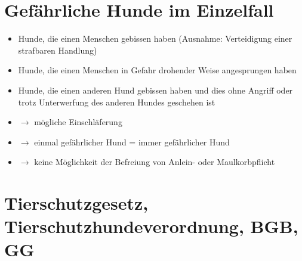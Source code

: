 \section{Gefährliche Hunde im Einzelfall}
    \begin{itemize}
        \item Hunde, die einen Menschen gebissen haben (Ausnahme: Verteidigung einer strafbaren Handlung)
        \item Hunde, die einen Menschen in Gefahr drohender Weise angesprungen haben
        \item Hunde, die einen anderen Hund gebissen haben und dies ohne Angriff oder trotz Unterwerfung des anderen Hundes geschehen ist
        \item $\rightarrow$ mögliche Einschläferung
        \item $\rightarrow$ einmal gefährlicher Hund = immer gefährlicher Hund
        \item $\rightarrow$ keine Möglichkeit der Befreiung von Anlein- oder Maulkorbpflicht
    \end{itemize}


\section{Tierschutzgesetz, Tierschutzhundeverordnung, BGB, GG}
